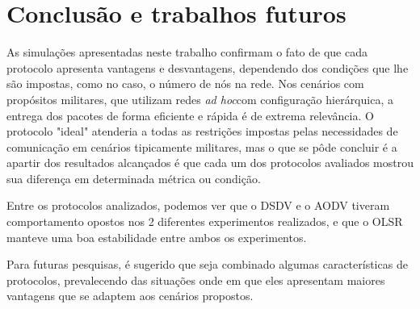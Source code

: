 \section{Conclus\~ao e trabalhos futuros}\label{conclusao}

As simula\c{c}\~oes apresentadas neste trabalho confirmam o fato de que cada protocolo apresenta vantagens e desvantagens, dependendo dos condi\c{c}\~oes que lhe s\~ao impostas, como no caso, o n\'umero de n\'os na rede. 
Nos cen\'arios com prop\'ositos militares, que utilizam redes \textit{ad hoc}com configura\c{c}\~ao hier\'arquica, a entrega dos pacotes de forma eficiente e r\'apida \'e de extrema relev\^ancia. 
O protocolo "ideal" atenderia a todas as restri\c{c}\~oes impostas pelas necessidades de comunica\c{c}\~ao em cen\'arios tipicamente militares, mas o que se p\^ode concluir \'e a apartir dos resultados alcan\c{c}ados \'e que cada um dos protocolos avaliados mostrou sua diferen\c{c}a em determinada m\'etrica ou condi\c{c}\~ao.

Entre os protocolos analizados, podemos ver que o DSDV e o AODV tiveram comportamento opostos nos 2 diferentes experimentos realizados, e que o OLSR manteve uma boa estabilidade entre ambos os experimentos.

Para futuras pesquisas, \'e sugerido que seja combinado algumas caracter\'isticas de protocolos, prevalecendo das situa\c{c}\~oes onde em que eles apresentam maiores vantagens que se adaptem aos cen\'arios propostos. 

